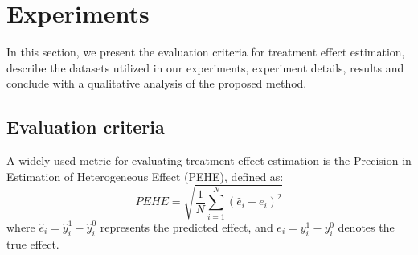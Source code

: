 \documentclass[doubleblind]{ecai}
\begin{document}
	\section{Experiments}
	In this section, we present the evaluation criteria for treatment effect estimation, describe the datasets utilized in our experiments, experiment details, results and conclude with a qualitative analysis of the proposed method. 
	\subsection{Evaluation criteria}
	A widely used metric for evaluating treatment effect estimation is the Precision in Estimation of Heterogeneous Effect (PEHE), defined as:
	\begin{equation}
		\mathit{PEHE}=\sqrt{\frac{1}{N}\sum_{i=1}^{N}(\hat{e}_{i}-e_{i})^2}
	\end{equation}
	where $\hat{e}_{i}=\hat{y}_{i}^{1}-\hat{y}_{i}^{0}$ represents the predicted effect, and ${e}_{i}={y}_{i}^{1}-{y}_{i}^{0}$ denotes the true effect.
	
\end{document}
